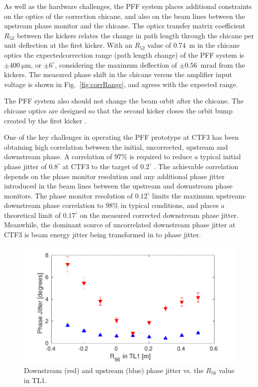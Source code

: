 \documentclass[%
 reprint,
 superscriptaddress,
 amsmath,
 amssymb,
 prl,
]{revtex4-1}
\begin{document}
As well as the hardware challenges, the PFF system places additional 
constraints on the optics of the correction 
chicane, and also on the beam lines between the upstream phase monitor and the 
chicane.
The optics transfer matrix coefficient \(R_{52}\) between the kickers relates 
the change in path length through the chicane per unit 
deflection at the first kicker. 
With an \(R_{52}\) value of \(0.74\)~m in the chicane optics 
\cite{RobertsThesis} the expectedcorrection range (path length change) of 
the PFF system is \(\pm400~\mathrm{\mu m}\), or \(\pm6^\circ\), considering the 
maximum deflection of \(\pm0.56\)~mrad from the kickers.
The measured phase shift in the chicane versus the amplifier input voltage is 
shown in Fig.~\ref{fig:corrRange}, and agrees with the expected range. 

The PFF system also should not change the beam orbit after the chicane. 
The chicane optics are designed so that the second kicker closes the orbit 
bump created by the first kicker \cite{RobertsThesis}.

One of the key challenges in operating the PFF prototype at CTF3 has been 
obtaining high correlation between the initial, uncorrected, upstream and 
downstream phase. 
A correlation of 97\% is required to reduce a typical initial 
phase jitter of \(0.8^\circ\) at CTF3 to the target of \(0.2^\circ\) 
\cite{RobertsThesis}. 
The achievable correlation depends on the phase monitor resolution and any 
additional phase jitter introduced in the beam lines between the upstream and 
downstream phase monitors. The phase monitor resolution of \(0.12^\circ\) 
limits the maximum upstream-downstream phase correlation to
\(98\%\) in typical conditions, and places a theoretical limit of
\(0.17^\circ\) on the measured corrected downstream phase 
jitter. 
Meanwhile, the dominant source of uncorrelated downstream phase jitter at CTF3 
is beam energy jitter being transformed in to phase jitter. 

\begin{figure}
	\includegraphics[width=\columnwidth]{figs/r56Scan}
	\caption{\label{fig:r56Scan}Downstream (red) and upstream (blue) phase 
	jitter vs. the \(R_{56}\) value in TL1. 
		}
\end{figure}
\end{document}
